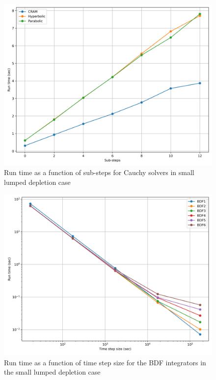\begin{figure}[p]
    \centering
    \includegraphics[width=5in]{images/chapter-5/caseStudies/smallLumpedDepletion/msrLumpedDepletionSmallCauchyRuntimes.png}
    \caption{Run time as a function of sub-steps for Cauchy solvers in small lumped depletion case}
    \label{fig:small_lumped_depletion_Cauchy_runtimes}
\end{figure}

\clearpage

\begin{figure}[p]
    \centering
    \includegraphics[width=5in]{images/chapter-5/caseStudies/smallLumpedDepletion/msrLumpedDepletionSmallIntegratorRuntimes.png}
    \caption{Run time as a function of time step size for the BDF integrators in the small lumped depletion case}
    \label{fig:small_lumped_depletion_integrator_runtimes}
\end{figure}

